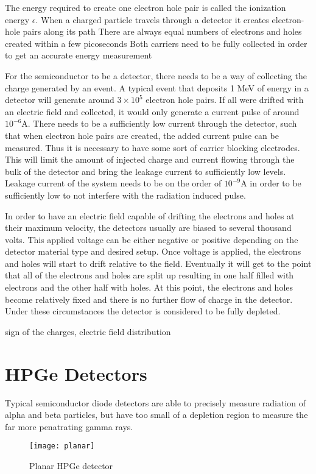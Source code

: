 The energy required to create one electron hole pair is called the ionization energy $\epsilon$.
When a charged particle travels through a detector it creates electron-hole pairs along its path
There are always equal numbers of electrons and holes created within a few picoseconds
Both carriers need to be fully collected in order to get an accurate energy measurement

For the semiconductor to be a detector, there needs to be a way of collecting the charge generated by an event.
A typical event that deposits 1 MeV of energy in a detector will generate around $3\times 10^{5}$ electron hole pairs.
If all were drifted with an electric field and collected, it would only generate a current pulse of around $10^{-6}$A.
There needs to be a sufficiently low current through the detector, such that when electron hole pairs are created, the added current pulse can be measured.
Thus it is necessary to have some sort of carrier blocking electrodes.
This will limit the amount of injected charge and current flowing through the bulk of the detector and bring the leakage current to sufficiently low levels.
Leakage current of the system needs to be on the order of $10^{-9}$A in order to be sufficiently low to not interfere with the radiation induced pulse.

In order to have an electric field capable of drifting the electrons and holes at their maximum velocity, the detectors usually are biased to several thousand volts.
This applied voltage can be either negative or positive depending on the detector material type and desired setup.
Once voltage is applied, the electrons and holes will start to drift relative to the field.
Eventually it will get to the point that all of the electrons and holes are split up resulting in one half filled with electrons and the other half with holes.
At this point, the electrons and holes become relatively fixed and there is no further flow of charge in the detector.
Under these circumstances the detector is considered to be fully depleted.

sign of the charges,
electric field distribution

\section {HPGe Detectors}
Typical semiconductor diode detectors are able to precisely measure radiation of alpha and beta particles, but have too small of a depletion region to measure the far more penatrating gamma rays.

\begin{figure}[htpb]
\centering
\texttt{[image: planar]}
\caption{Planar HPGe detector}
\label{fig:planar}
\end{figure}